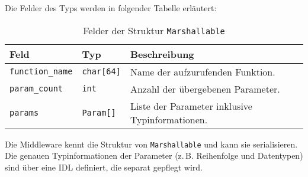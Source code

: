 \noindent Die Felder des Typs werden in folgender Tabelle erläutert:

\begin{table}[h]
	\centering
	\caption{Felder der Struktur \texttt{Marshallable}}
	\begin{tabularx}{\textwidth}{|l|l|X|}
		\hline
		\textbf{Feld} & \textbf{Typ} & \textbf{Beschreibung} \\
		\hline
		\texttt{function\_name} & \texttt{char[64]} & Name der aufzurufenden Funktion. \\
		\hline
		\texttt{param\_count} & \texttt{int} & Anzahl der übergebenen Parameter. \\
		\hline
		\texttt{params} & \texttt{Param[]} & Liste der Parameter inklusive Typinformationen. \\
		\hline
	\end{tabularx}
\end{table}

\noindent
Die Middleware kennt die Struktur von \texttt{Marshallable} und kann sie serialisieren. Die genauen Typinformationen der Parameter (z.\,B. Reihenfolge und Datentypen) sind über eine IDL definiert, die separat gepflegt wird.

